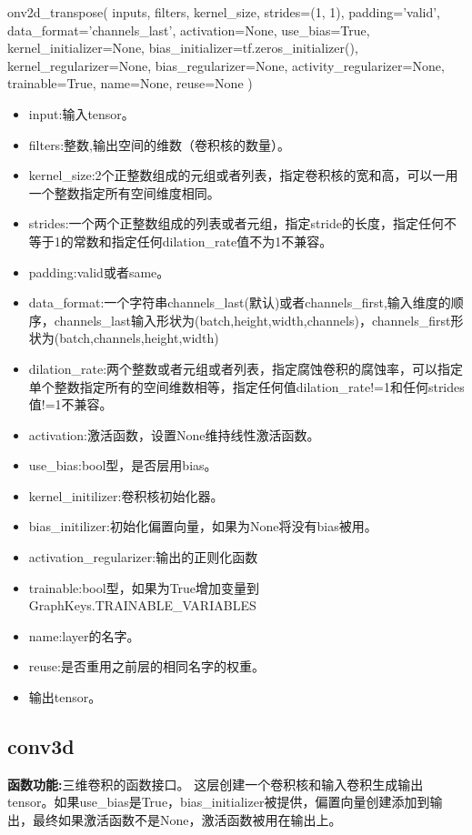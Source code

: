 \begin{python}
onv2d_transpose(
    inputs,
    filters,
    kernel_size,
    strides=(1, 1),
    padding='valid',
    data_format='channels_last',
    activation=None,
    use_bias=True,
    kernel_initializer=None,
    bias_initializer=tf.zeros_initializer(),
    kernel_regularizer=None,
    bias_regularizer=None,
    activity_regularizer=None,
    trainable=True,
    name=None,
    reuse=None
)
\end{python}
\begin{itemize}
	\item input:输入tensor。
	\item filters:整数,输出空间的维数（卷积核的数量）。
	\item kernel\_size:2个正整数组成的元组或者列表，指定卷积核的宽和高，可以一用一个整数指定所有空间维度相同。
	\item strides:一个两个正整数组成的列表或者元组，指定stride的长度，指定任何不等于1的常数和指定任何dilation\_rate值不为1不兼容。
	\item padding:valid或者same。
	\item data\_format:一个字符串channels\_last(默认)或者channels\_first,输入维度的顺序，channels\_last输入形状为(batch,height,width,channels)，channels\_first形状为(batch,channels,height,width)
	\item dilation\_rate:两个整数或者元组或者列表，指定腐蚀卷积的腐蚀率，可以指定单个整数指定所有的空间维数相等，指定任何值dilation\_rate!=1和任何strides值!=1不兼容。
	\item activation:激活函数，设置None维持线性激活函数。
	\item use\_bias:bool型，是否层用bias。
	\item kernel\_initilizer:卷积核初始化器。
	\item bias\_initilizer:初始化偏置向量，如果为None将没有bias被用。
	\item activation\_regularizer:输出的正则化函数
	\item trainable:bool型，如果为True增加变量到GraphKeys.TRAINABLE\_VARIABLES
	\item name:layer的名字。
	\item reuse:是否重用之前层的相同名字的权重。
	\item 输出tensor。
\end{itemize}
\subsection{conv3d}
\textbf{函数功能:}三维卷积的函数接口。
这层创建一个卷积核和输入卷积生成输出tensor。如果use\_bias是True，bias\_initializer被提供，偏置向量创建添加到输出，最终如果激活函数不是None，激活函数被用在输出上。

